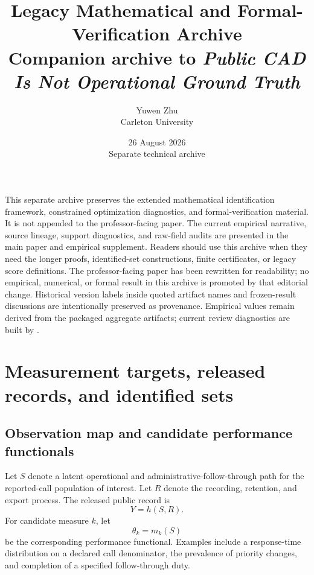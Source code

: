 \documentclass[11pt]{article}
\title{\vspace{-1.6em}\textbf{Legacy Mathematical and Formal-Verification Archive}\\[0.35em]
\large Companion archive to \emph{Public CAD Is Not Operational Ground Truth}}
\author{Yuwen Zhu\\Carleton University}
\date{26 August 2026\\[0.2em]\small Separate technical archive}
\begin{document}
\maketitle
\thispagestyle{plain}
\vspace{-1.2em}

\begin{plainbox}[title=Purpose and reading guide]
This separate archive preserves the extended mathematical identification framework, constrained optimization diagnostics, and formal-verification material. It is not appended to the professor-facing paper. The current empirical narrative, source lineage, support diagnostics, and raw-field audits are presented in the main paper and empirical supplement. Readers should use this archive when they need the longer proofs, identified-set constructions, finite certificates, or legacy score definitions. The professor-facing paper has been rewritten for readability; no empirical, numerical, or formal result in this archive is promoted by that editorial change. Historical version labels inside quoted artifact names and frozen-result discussions are intentionally preserved as provenance. Empirical values remain derived from the packaged aggregate artifacts; current review diagnostics are built by .
\end{plainbox}

\setcounter{tocdepth}{1}
\begingroup
\small
\tableofcontents
\endgroup
\newpage

\section{Measurement targets, released records, and identified sets}
\label{sec:measurement_map}

\subsection{Observation map and candidate performance functionals}

Let $S$ denote a latent operational and administrative-follow-through path for the reported-call population of interest. Let $R$ denote the recording, retention, and export process. The released public record is
\begin{equation}
Y=h(S,R).
\label{eq:observation_map}
\end{equation}
For candidate measure $k$, let
\begin{equation}
\theta_k=m_k(S)
\label{eq:performance_functional}
\end{equation}
be the corresponding performance functional. Examples include a response-time distribution on a declared call denominator, the prevalence of priority changes, and completion of a specified follow-through duty.
\end{document}
